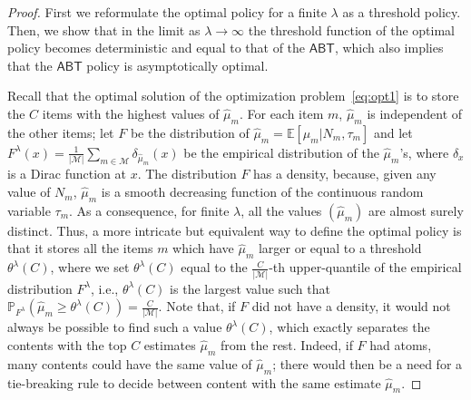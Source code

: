 \documentclass[10pt, conference, letterpaper]{IEEEtran}
\newcommand{\ABT}{\textsf{ABT}}
\newcommand{\mean}[1]{\mathbb{E}\!\left[#1\right]}
\def\Mcal{\mathcal{M}}
\def\PP{\mathbb{P}}
\begin{document}
\begin{proof}First we reformulate the  optimal policy for a finite $\lambda$ as a threshold policy. Then, we show that in the limit as $\lambda\to\infty$ the threshold function of the optimal policy becomes deterministic and equal to that of the $\ABT$, which also implies that the $\ABT$ policy is asymptotically optimal.

Recall that the optimal solution of the optimization problem~\eqref{eq:opt1} is to store the $C$ items with the highest values of $\widehat \mu_m$. For each item $m$, $\widehat \mu_m$ is independent of the other items; let $F$ be the distribution of $\widehat \mu_m=\mean{\mu_m|N_m,\tau_m}$ and let $F^\lambda(x)=\frac1{|\Mcal|}\sum_{m\in\Mcal}\delta_{\widehat \mu_m}(x)$ be the empirical distribution of the $\widehat \mu_m$'s, where $\delta_x$ is a Dirac function at $x$. The distribution $F$ has a density, because, given any value of $N_m$, $\widehat \mu_m$ is a smooth decreasing function of the continuous random variable $\tau_m$. As a consequence, for finite $\lambda$, all the values $(\widehat \mu_m)$ are almost surely distinct. Thus, a more intricate but equivalent way to define the optimal policy is that it stores all the items $m$ which have $\widehat \mu_m$ larger or equal to a threshold $\theta^\lambda(C)$, where we set $\theta^\lambda(C)$ equal to the $\frac C{|\Mcal|}$-th upper-quantile of the empirical distribution $F^\lambda$, i.e., $\theta^\lambda(C)$ is the largest value such that $\PP_{F^\lambda}\left(\widehat \mu_m\geq\theta^\lambda(C)\right)=\frac C{|\Mcal|}$. Note that, if $F$ did not have a density, it would not always be possible to find such a value $\theta^\lambda(C)$, which exactly separates the contents with the top $C$ estimates $\widehat \mu_m$ from the rest. Indeed, if $F$ had atoms, many contents could have the same value of $\widehat \mu_m$; there would then be a need for a tie-breaking rule to decide between content with the same estimate $\widehat \mu_m$.


\end{proof}
\end{document}
